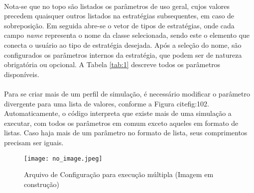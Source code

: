 \paragraph{} Nota-se que no topo são listados os parâmetros de uso geral, cujos valores precedem quaisquer outros listados na estratégias subsequentes, em caso de sobreposição. Em seguida abre-se o vetor de tipos de estratégias, onde cada campo \textit{name} representa o nome da classe selecionada, sendo este o elemento que conecta o usuário ao tipo de estratégia desejada. Após a seleção do nome, são configurados os parâmetros internos da estratégia, que podem ser de natureza obrigatória ou opcional. A Tabela \ref{tab:1} descreve todos os parâmetros disponíveis.

\paragraph{} Para se criar mais de um perfil de simulação, é necessário modificar o parâmetro divergente para uma lista de valores, conforme a Figura cite{fig:102}. Automaticamente, o código interpreta que existe mais de uma simulação a executar, com todos os parâmetros em comum exceto aqueles em formato de listas. Caso haja mais de um parâmetro no formato de lista, seus comprimentos precisam ser iguais.

\begin{figure}[h]
    \texttt{[image: no\_image.jpeg]}
    \centering
    \caption{Arquivo de Configuração para execução múltipla (Imagem em construção)}
    \label{fig:102}
\end{figure}


